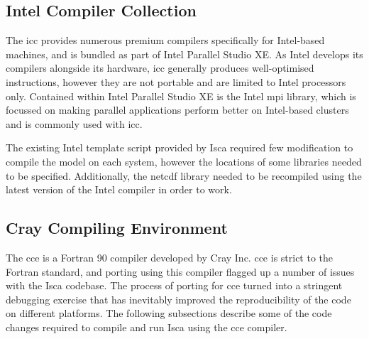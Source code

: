 \documentclass[a4paper,11pt]{report}
\begin{document}
\subsection{Intel Compiler Collection}
The \gls{icc} provides numerous premium compilers specifically for Intel-based machines, and is bundled as part of Intel Parallel Studio XE. As Intel develops its compilers alongside its hardware, \gls{icc} generally produces well-optimised instructions, however they are not portable and are limited to Intel processors only. Contained within Intel Parallel Studio XE is the Intel \gls{mpi} library, which is focussed on making parallel applications perform better on Intel-based clusters and is commonly used with \gls{icc}.
\par
The existing Intel template script provided by Isca required few modification to compile the model on each system, however the locations of some libraries needed to be specified. Additionally, the \gls{netcdf} library needed to be recompiled using the latest version of the Intel compiler in order to work. 


\subsection{Cray Compiling Environment}
The \gls{cce} is a Fortran 90 compiler developed by Cray Inc. \gls{cce} is strict to the Fortran standard, and porting using this compiler flagged up a number of issues with the Isca codebase. The process of porting for \gls{cce} turned into a stringent debugging exercise that has inevitably improved the reproducibility of the code on different platforms. The following subsections describe some of the code changes required to compile and run Isca using the \gls{cce} compiler.
\end{document}
